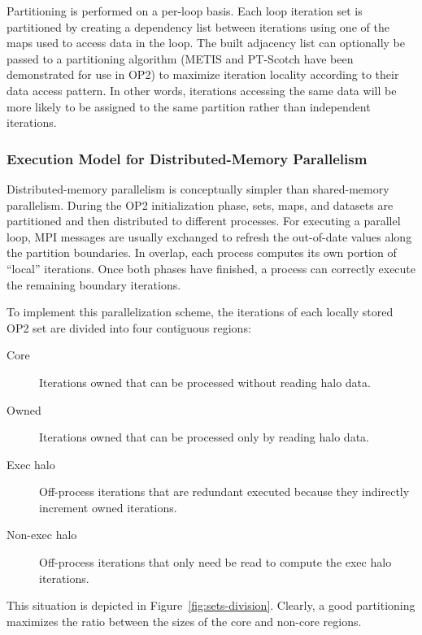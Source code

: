 Partitioning is performed on a per-loop basis. Each loop iteration set is partitioned by creating a dependency list between iterations using one of the maps used to access data in the loop. The built adjacency list can optionally be passed to a partitioning algorithm (METIS and PT-Scotch have been demonstrated for use in OP2) to maximize iteration locality according to their data access pattern. In other words, iterations accessing the same data will be more likely to be assigned to the same partition rather than independent iterations.

\subsubsection{Execution Model for Distributed-Memory Parallelism}
Distributed-memory parallelism is conceptually simpler than shared-memory parallelism. During the OP2 initialization phase, sets, maps, and datasets are partitioned and then distributed to different processes. For executing a parallel loop, MPI messages are usually exchanged to refresh the out-of-date values along the partition boundaries. In overlap, each process computes its own portion of ``local'' iterations. Once both phases have finished, a process can correctly execute the remaining boundary iterations.

To implement this parallelization scheme, the iterations of each locally stored OP2 set are divided into four contiguous regions:
\begin{description}
\item[Core] Iterations owned that can be processed without reading halo data. 
\item[Owned] Iterations owned that can be processed only by reading halo data.
\item[Exec halo] Off-process iterations that are redundant executed because they indirectly increment owned iterations.
\item[Non-exec halo] Off-process iterations that only need be read to compute the exec halo iterations.
\end{description}
This situation is depicted in Figure~\ref{fig:sets-division}. Clearly, a good partitioning maximizes the ratio between the sizes of the core and non-core regions. 



